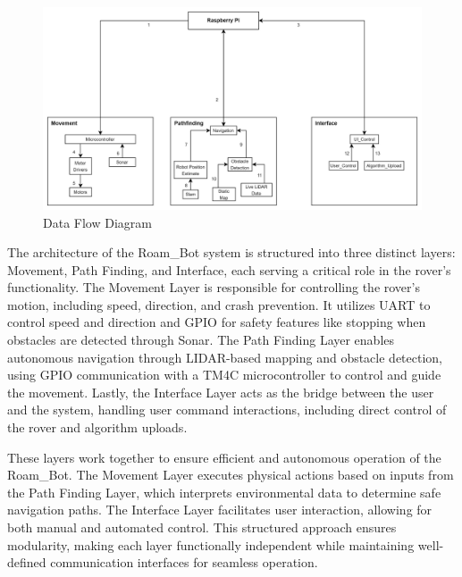 
\begin{figure}[h!]
	\centering
 	\includegraphics[width=1\textwidth]{images/data_flow.jpg}
 \caption{Data Flow Diagram}
\end{figure}

The architecture of the Roam\_Bot system is structured into three distinct layers: Movement, Path Finding, and Interface, each serving a critical role in the rover's functionality. The Movement Layer is responsible for controlling the rover's motion, including speed, direction, and crash prevention. It utilizes UART to control speed and direction and GPIO for safety features like stopping when obstacles are detected through Sonar. The Path Finding Layer enables autonomous navigation through LIDAR-based mapping and obstacle detection, using GPIO communication with a TM4C microcontroller to control and guide the movement. Lastly, the Interface Layer acts as the bridge between the user and the system, handling user command interactions, including direct control of the rover and algorithm uploads.

These layers work together to ensure efficient and autonomous operation of the Roam\_Bot. The Movement Layer executes physical actions based on inputs from the Path Finding Layer, which interprets environmental data to determine safe navigation paths. The Interface Layer facilitates user interaction, allowing for both manual and automated control. This structured approach ensures modularity, making each layer functionally independent while maintaining well-defined communication interfaces for seamless operation.
